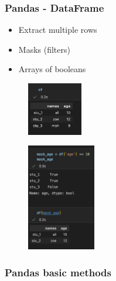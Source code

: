 \begin{frame}\frametitle{Pandas - DataFrame}
   \begin{minipage}{0.58\linewidth}
      \begin{itemize}
         \item Extract multiple rows
         \item Masks (filters)
         \item Arrays of booleans
      \end{itemize}
      \vspace{.5cm}
      \begin{figure}[H]
         \includegraphics[width=2.4cm]{../images/illustrations/pandas_df_ex.png}
      \end{figure}
   \end{minipage}
   \begin{minipage}{0.38\linewidth}
      \begin{figure}[H]
         \includegraphics[width=3cm]{../images/illustrations/pandas_mask.png}
      \end{figure}
   \end{minipage}
\end{frame}


\subsubsection{Pandas basic methods}


